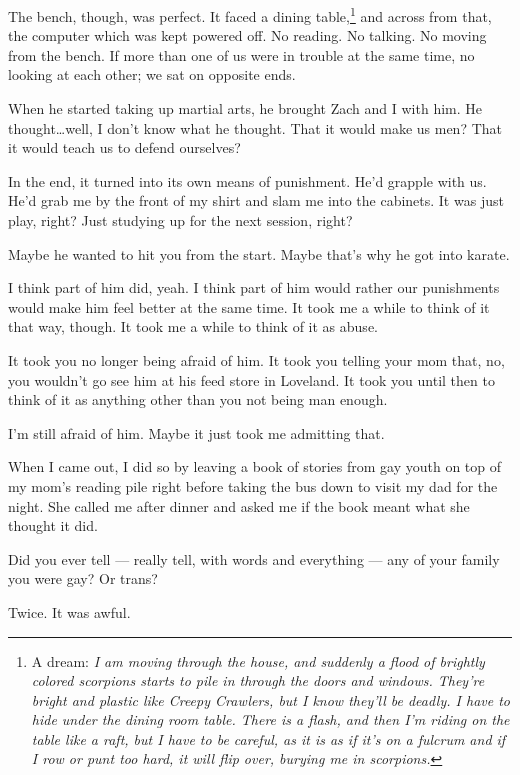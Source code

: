 The bench, though, was perfect. It faced a dining table,\footnote{\color[HTML]{222288}A dream: \emph{I am moving through the house, and suddenly a flood of brightly colored scorpions starts to pile in through the doors and windows. They're bright and plastic like Creepy Crawlers, but I know they'll be deadly. I have to hide under the dining room table. There is a flash, and then I'm riding on the table like a raft, but I have to be careful, as it is as if it's on a fulcrum and if I row or punt too hard, it will flip over, burying me in scorpions.}} and across from that, the computer which was kept powered off. No reading. No talking. No moving from the bench. If more than one of us were in trouble at the same time, no looking at each other; we sat on opposite ends.

When he started taking up martial arts, he brought Zach and I with him. He thought\ldots{}well, I don't know what he thought. That it would make us men? That it would teach us to defend ourselves?

In the end, it turned into its own means of punishment. He'd grapple with us. He'd grab me by the front of my shirt and slam me into the cabinets. It was just play, right? Just studying up for the next session, right?

\begin{ally}
Maybe he wanted to hit you from the start. Maybe that's why he got into karate.
\end{ally}
I think part of him did, yeah. I think part of him would rather our punishments would make him feel better at the same time. It took me a while to think of it that way, though. It took me a while to think of it as abuse.

\begin{ally}
It took you no longer being afraid of him. It took you telling your mom that, no, you wouldn't go see him at his feed store in Loveland. It took you until then to think of it as anything other than you not being man enough.
\end{ally}
I'm still afraid of him. Maybe it just took me admitting that.
\newpage

\noindent When I came out, I did so by leaving a book of stories from gay youth on top of my mom's reading pile right before taking the bus down to visit my dad for the night. She called me after dinner and asked me if the book meant what she thought it did.

\begin{ally}
Did you ever tell --- really tell, with words and everything --- any of your family you were gay? Or trans?
\end{ally}
Twice. It was awful.

